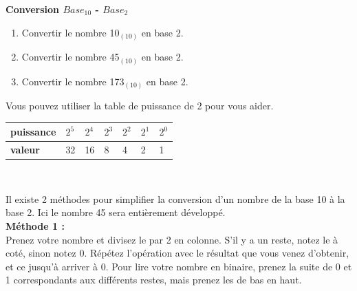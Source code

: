 \begin{Exercice}[5 minutes]  \textbf{Conversion $Base_{10}$ - $Base_2$}\\
    \begin{enumerate}
        \item Convertir le nombre 10$_{(10)}$ en base 2.
        \item Convertir le nombre 45$_{(10)}$ en base 2.
        \item Convertir le nombre 173$_{(10)}$ en base 2.
    \end{enumerate}

    \begin{conseil}
    
        Vous pouvez utiliser la table de puissance de 2 pour vous aider. \\
        
        \begin{tabular}{| C{0.1\textwidth} | C{0.1\textwidth} | C{0.1\textwidth} | C{0.1\textwidth} | C{0.1\textwidth} | C{0.1\textwidth} | C{0.1\textwidth} |} 
            \hline
            \textbf{puissance} & $2^{5}$ & $2^{4}$ & $2^{3}$ & $2^{2}$ & $2^{1}$ & $2^{0}$ \\ [0.5ex] 
            \hline
            \textbf{valeur} & 32 & 16 & 8 & 4 & 2 & 1 \\ [0.5ex] 
            \hline
        \end{tabular} \\
        
    \end{conseil}
    \begin{solution}
        Il existe 2 méthodes pour simplifier la conversion d'un nombre de la base 10 à la base 2. Ici le nombre 45 sera entièrement développé. \\
        
        
        \textbf{Méthode 1 :} \\
        
        
        Prenez votre nombre et divisez le par 2 en colonne. S'il y a un reste, notez le à coté, sinon notez 0. Répétez l'opération avec le résultat que vous venez d'obtenir, et ce jusqu'à arriver à 0. Pour lire votre nombre en binaire, prenez la suite de 0 et 1 correspondants aux différents restes, mais prenez les de bas en haut. \\
       	

\end{solution}
\end{Exercice}
